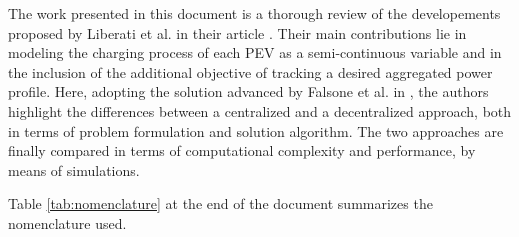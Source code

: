 The work presented in this document is a thorough review of the developements proposed by Liberati et al. in their article \autocite{10194623}. Their main contributions lie in modeling the charging process of each PEV as a semi-continuous variable and in the inclusion of the additional objective of tracking a desired aggregated power profile. Here, adopting the solution advanced by Falsone et al. in \autocite{FALSONE2019141}, the authors highlight the differences between a centralized and a decentralized approach, both in terms of problem formulation and solution algorithm. The two approaches are finally compared in terms of computational complexity and performance, by means of simulations.

Table \ref{tab:nomenclature} at the end of the document summarizes the nomenclature used.